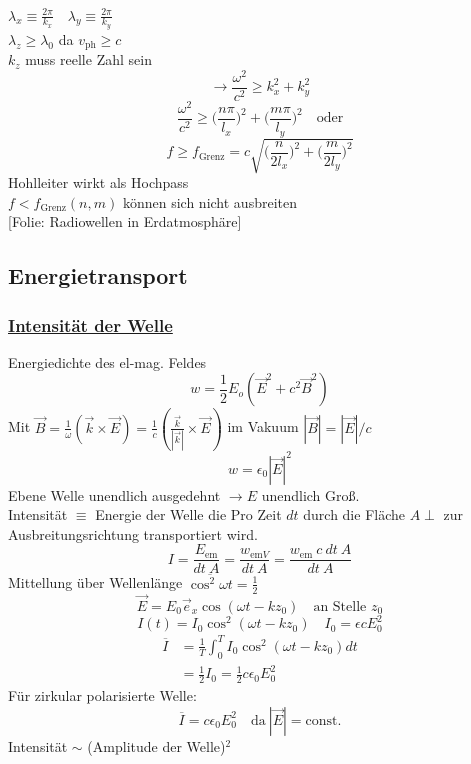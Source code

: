 \documentclass[titlepage,12pt,a4paper,ngerman]{report}
\newcommand{\tx}[1]{\textrm{#1}}
\newcommand{\folie}[1]{\color{gray}[Folie: #1]\color{black}}
\begin{document}
\begin{enumerate}[a)]
\begin{itemize}
		$ \lambda_x \equiv \frac{2 \pi}{k_x} \quad \lambda_y \equiv \frac{2 \pi}{k_y}$\\
		$ \lambda_z \ge \lambda_0 $ da $ v_{\tx{ph}} \ge c $\\
		$ k_z $ muss reelle Zahl sein
		$$ \rightarrow \frac{\omega^2}{c^2} \ge k_x^2 + k_y^2 $$
		$$\frac{\omega^2}{c^2} \ge \bigg(\frac{n \pi}{l_x}\bigg)^2 + \bigg(\frac{m \pi}{l_y}\bigg)^2 \quad \tx{oder}$$
		$$f \ge f_{\tx{Grenz}} = c \sqrt{\bigg(\frac{n}{2l_x}\bigg)^2 + \bigg(\frac{m}{2l_y}\bigg)^2}$$
		Hohlleiter wirkt als Hochpass\\
		$ f < f_{\tx{Grenz}}(n,m) $ können sich nicht ausbreiten\\
		\folie{Radiowellen in Erdatmosphäre}\\
	\end{itemize}
\end{enumerate}

\subsection{Energietransport}
\subsubsection{\underline{Intensität der Welle}}
Energiedichte des el-mag. Feldes
$$ w = \frac{1}{2} E_o (\vec{E}^2 + c^2 \vec{B}^2)$$
Mit $ \vec{B} = \frac{1}{\omega} (\vec{k} \times \vec{E}) = \frac{1}{c} (\frac{\vec{k}}{|\vec{k}|} \times \vec{E}) $ im Vakuum $ |\vec{B}| = |\vec{E}|/c $\\
$$ w = \epsilon_0 |\vec{E}|^2 $$
Ebene Welle unendlich ausgedehnt $ \rightarrow E $ unendlich Groß.\\
Intensität $ \equiv $ Energie der Welle die Pro Zeit $ dt $ durch die Fläche $ A \perp $ zur Ausbreitungsrichtung transportiert wird.
\begin{equation*}
I = \frac{E_{\tx{em}}}{dt \ A} = \frac{w_{\tx{em} V}}{dt \ A} = \frac{w_{\tx{em}} \:c\: dt\ A}{dt \ A}
\end{equation*}
Mittellung über Wellenlänge $ \overline{\cos^2 \omega t} = \frac{1}{2} $
\begin{equation*}
\vec{E} = E_0 \vec{e}_x \cos(\omega t - k z_0) \quad \tx{an Stelle } z_0
\end{equation*}
\begin{equation*}
I(t) = I_0 \cos^2(\omega t - k z_0) \quad I_0 = \epsilon c E_0^2
\end{equation*}
\begin{align*}
\overline{I} &= \frac{1}{T} \int_{0}^{T} I_0 \cos^2(\omega t - kz_0) dt\\
&= \frac{1}{2} I_0 = \frac{1}{2} c \epsilon_0 E_0^2
\end{align*}
Für zirkular polarisierte Welle:
$$\overline{I} = c \epsilon_0 E_0^2 \quad \tx{da} \ |\vec{E}| = \tx{const.}$$
Intensität $ \sim $ (Amplitude der Welle)$ ^2 $\\[5pt]
\end{document}
